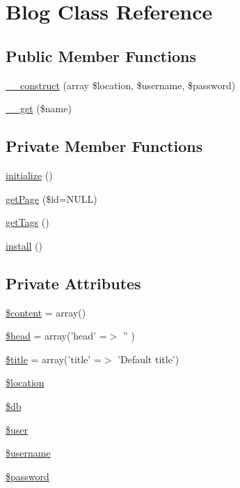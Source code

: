 \hypertarget{classBlog}{
\section{Blog Class Reference}
\label{classBlog}
}
\subsection*{Public Member Functions}
\begin{CompactItemize}
\item 
\hyperlink{classBlog_40f2b1a8e155ea8ae021e5606484cab1}{\_\-\_\-construct} (array \$location, \$username, \$password)
\item 
\hyperlink{classBlog_0fbd3b0292d70e0975a29a0402701b98}{\_\-\_\-get} (\$name)
\end{CompactItemize}
\subsection*{Private Member Functions}
\begin{CompactItemize}
\item 
\hyperlink{classBlog_34c4a536cfa1342b35c0dc3215d7f0ba}{initialize} ()
\item 
\hyperlink{classBlog_cbf942c6cbeb2e2f6f55f30a30391a0e}{getPage} (\$id=NULL)
\item 
\hyperlink{classBlog_92516498af4c4b17491d390725df038b}{getTags} ()
\item 
\hyperlink{classBlog_1977c12b27f8729e078d08439814e293}{install} ()
\end{CompactItemize}
\subsection*{Private Attributes}
\begin{CompactItemize}
\item 
\hyperlink{classBlog_1b4cf0388b49fb47b9f048a888003172}{\$content} = array()
\item 
\hyperlink{classBlog_d7904d5d75bba12e8c9449b6a692e598}{\$head} = array('head' =$>$ '' )
\item 
\hyperlink{classBlog_0cd1af25f3b38873d57c33c2542dacc7}{\$title} = array('title' =$>$ 'Default title')
\item 
\hyperlink{classBlog_22fd08c70b0a938697bb0b4a0ec97a18}{\$location}
\item 
\hyperlink{classBlog_bdac60715ec7077cef7ae3647394b769}{\$db}
\item 
\hyperlink{classBlog_848e0309404b8bf01fd3577fe6190bb6}{\$user}
\item 
\hyperlink{classBlog_81523bc8c63e738d89791f27263903aa}{\$username}
\item 
\hyperlink{classBlog_7cec9963b5a835d5486ac424e6e7a49e}{\$password}
\end{CompactItemize}



